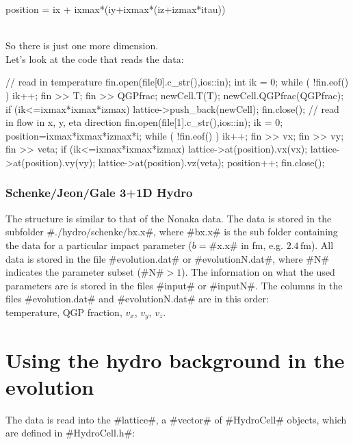 \begin{boxedverbatim}
 position = ix + ixmax*(iy+ixmax*(iz+izmax*itau))
\end{boxedverbatim}

~\\
So there is just one more dimension. 
~\\

Let's look at the code that reads the data:

\begin{boxedverbatim}
   // read in temperature
   fin.open(file[0].c_str(),ios::in);
   int ik = 0;
   while ( !fin.eof() )
     {
       ik++;
       fin >> T;
       fin >> QGPfrac;
       newCell.T(T);
       newCell.QGPfrac(QGPfrac);
       if (ik<=ixmax*ixmax*izmax) lattice->push_back(newCell);
     }
   fin.close();  
   // read in flow in x, y, eta direction
   fin.open(file[1].c_str(),ios::in);
   ik = 0;
   position=ixmax*ixmax*izmax*i;
   while ( !fin.eof() )
     {
       ik++;
       fin >> vx;
       fin >> vy;
       fin >> veta;
       if (ik<=ixmax*ixmax*izmax)
         {
           lattice->at(position).vx(vx);
           lattice->at(position).vy(vy);
           lattice->at(position).vz(veta);
           position++;
         }
     }
   fin.close();
\end{boxedverbatim}

\subsubsection{Schenke/Jeon/Gale 3+1D Hydro}
\label{schenkedata}
The structure is similar to that of the Nonaka data.
The data is stored in the subfolder #./hydro/schenke/bx.x#, where #bx.x# is the sub folder 
containing the data for a particular impact parameter ($b=$#x.x# in fm, e.g. $2.4\,\mathrm{fm}$).
All data is stored in the file #evolution.dat# or #evolutionN.dat#, where #N# indicates the parameter subset
(#N#$>1$). The information on what the used parameters are is stored in the files #input# or #inputN#.
The columns in the files #evolution.dat# and #evolutionN.dat# are in this order:\\
temperature, QGP fraction, $v_x$, $v_y$, $v_z$.



\newpage
\section{Using the hydro background in the evolution}
The data is read into the #lattice#, a #vector# of #HydroCell# objects, which are defined in #HydroCell.h#:\\
~\\

